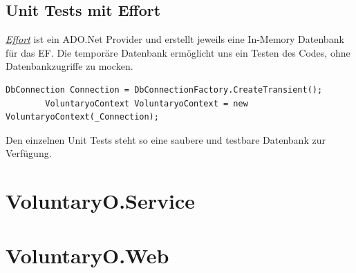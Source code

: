 	\subsection{Unit Tests mit Effort}
	\href{https://effort.codeplex.com/}{\textit{Effort}} ist ein ADO.Net Provider und erstellt jeweils eine In-Memory Datenbank für das EF. Die temporäre Datenbank ermöglicht uns ein Testen des Codes, ohne Datenbankzugriffe zu mocken.
	\begin{lstlisting}[language=CSharp, caption=Verwendung Effort für Unit Tests in EffortTest.cs, label=lst:effortunittest, firstnumber=1]
		DbConnection Connection = DbConnectionFactory.CreateTransient();
		VoluntaryoContext VoluntaryoContext = new VoluntaryoContext(_Connection);
    \end{lstlisting}
    Den einzelnen Unit Tests steht so eine saubere und testbare Datenbank zur Verfügung.


\section{VoluntaryO.Service}

\section{VoluntaryO.Web}
